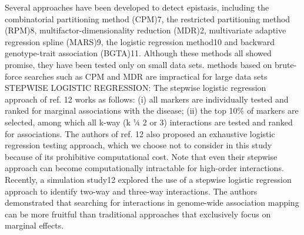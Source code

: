	Several approaches have been developed to detect epistasis, including the combinatorial partitioning method (CPM)7, the restricted partitioning method (RPM)8, multifactor-dimensionality reduction (MDR)2, multivariate adaptive regression spline (MARS)9, the logistic regression method10 and backward genotype-trait association (BGTA)11. Although these methods all showed promise, they have been tested only on small data sets.  \cite{zhang2007bayesian}
	methods based on brute-force searches such as CPM and MDR are impractical for large data sets \cite{zhang2007bayesian}
	STEPWISE LOGISTIC REGRESSION: The stepwise logistic regression approach of ref. 12 works as follows: (i) all markers are individually tested and ranked for marginal associations with the disease; (ii) the top 10\% of markers are selected, among which all k-way (k 1⁄4 2 or 3) interactions are tested and ranked for associations. The authors of ref. 12 also proposed an exhaustive logistic regression testing approach, which we choose not to consider in this study because of its prohibitive computational cost.  Note that even their stepwise approach can become computationally intractable for high-order interactions.  \cite{zhang2007bayesian}
	Recently, a simulation study12 explored the use of a stepwise logistic regression approach to identify two-way and three-way interactions. The authors demonstrated that searching for interactions in genome-wide association mapping can be more fruitful than traditional approaches that exclusively focus on marginal effects. \cite{zhang2007bayesian}

